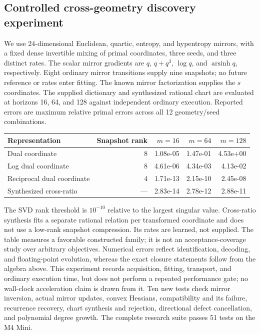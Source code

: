 \subsection{Controlled cross-geometry discovery experiment}
We use 24-dimensional Euclidean, quartic, entropy, and hypentropy mirrors,
with a fixed dense invertible mixing of primal coordinates, three seeds,
and three distinct rates. The scalar mirror gradients are $q$, $q+q^3$,
$\log q$, and $\operatorname{arsinh}q$, respectively. Eight ordinary mirror
transitions supply nine snapshots; no future reference or rates enter fitting.
The known mirror factorization supplies the $s$ coordinates. The supplied
dictionary and synthesized rational chart are evaluated at horizons 16, 64,
and 128 against independent ordinary execution. Reported errors are maximum
relative primal errors across all 12 geometry/seed combinations.
\begin{center}\small
\begin{tabular}{lrrrr}\toprule
Representation & Snapshot rank & $m=16$ & $m=64$ & $m=128$\\\midrule
Dual coordinate & 8 & 1.08e-05 & 1.47e-01 & 4.53e+00\\
Log dual coordinate & 8 & 4.61e-06 & 4.34e-03 & 4.13e-02\\
Reciprocal dual coordinate & 4 & 1.71e-13 & 2.15e-10 & 2.45e-08\\
Synthesized cross-ratio & --- & 2.83e-14 & 2.78e-12 & 2.88e-11\\
\bottomrule\end{tabular}\end{center}
The SVD rank threshold is $10^{-10}$ relative to the largest singular value.
Cross-ratio synthesis fits a separate rational relation per transformed
coordinate and does not use a low-rank snapshot compression. Its rates are
learned, not supplied. The table measures a favorable constructed family;
it is not an acceptance-coverage study over arbitrary objectives. Numerical
errors reflect identification, decoding, and floating-point evolution, whereas
the exact closure statements follow from the algebra above. This experiment
records acquisition, fitting, transport, and ordinary execution time, but does
not perform a repeated performance gate; no wall-clock acceleration claim
is drawn from it. Ten new tests check mirror inversion, actual mirror updates,
convex Hessians, compatibility and its failure, recurrence recovery, chart
synthesis and rejection, directional defect cancellation, and polynomial
degree growth. The complete research suite passes 51 tests on the M4 Mini.
